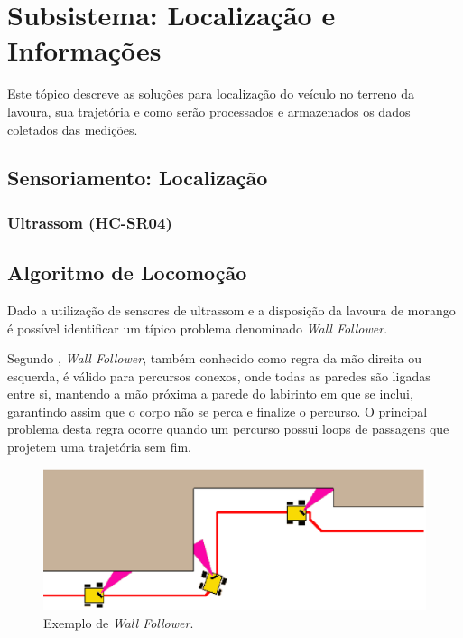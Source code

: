 \section{Subsistema: Localização e Informações}
	Este tópico descreve as soluções para localização do veículo no terreno da lavoura, sua trajetória e
	como serão processados e armazenados os dados coletados das medições.

  \subsection{Sensoriamento: Localização}

  \subsubsection{Ultrassom (HC-SR04)}



  \subsection{Algoritmo de Locomoção}
    Dado a utilização de sensores de ultrassom e a disposição da lavoura de morango
    é possível identificar um típico problema denominado \textit{Wall Follower}.

    Segundo \cite{huang2009}, \textit{Wall Follower},
    também conhecido como regra da mão direita ou esquerda, é válido para percursos conexos, onde todas as paredes são ligadas entre si, mantendo a mão próxima a parede do labirinto em
    que se inclui, garantindo assim que o corpo não se perca e finalize
    o percurso. O principal problema desta regra ocorre quando um percurso
    possui loops de passagens que projetem uma trajetória sem fim. 

    \begin{figure}[!htbp]
    \begin{center}
    \includegraphics[width=.7\textwidth]{figuras/wallfollower.eps}
    \caption{\label{fig:wallfollower}Exemplo de \textit{Wall Follower}.}
    \end{center}
    \end{figure}

